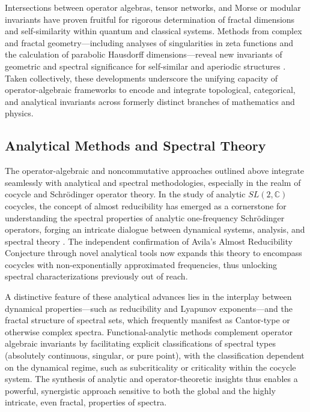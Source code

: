Intersections between operator algebras, tensor networks, and Morse or modular invariants have proven fruitful for rigorous determination of fractal dimensions and self-similarity within quantum and classical systems. Methods from complex and fractal geometry—including analyses of singularities in zeta functions and the calculation of parabolic Hausdorff dimensions—reveal new invariants of geometric and spectral significance for self-similar and aperiodic structures \cite{ref2,ref19,ref14}. Taken collectively, these developments underscore the unifying capacity of operator-algebraic frameworks to encode and integrate topological, categorical, and analytical invariants across formerly distinct branches of mathematics and physics.

\subsection{Analytical Methods and Spectral Theory}

The operator-algebraic and noncommutative approaches outlined above integrate seamlessly with analytical and spectral methodologies, especially in the realm of cocycle and Schrödinger operator theory. In the study of analytic $SL(2,\mathbb{C})$ cocycles, the concept of almost reducibility has emerged as a cornerstone for understanding the spectral properties of analytic one-frequency Schrödinger operators, forging an intricate dialogue between dynamical systems, analysis, and spectral theory \cite{ref91}. The independent confirmation of Avila's Almost Reducibility Conjecture through novel analytical tools now expands this theory to encompass cocycles with non-exponentially approximated frequencies, thus unlocking spectral characterizations previously out of reach.

A distinctive feature of these analytical advances lies in the interplay between dynamical properties—such as reducibility and Lyapunov exponents—and the fractal structure of spectral sets, which frequently manifest as Cantor-type or otherwise complex spectra. Functional-analytic methods complement operator algebraic invariants by facilitating explicit classifications of spectral types (absolutely continuous, singular, or pure point), with the classification dependent on the dynamical regime, such as subcriticality or criticality within the cocycle system. The synthesis of analytic and operator-theoretic insights thus enables a powerful, synergistic approach sensitive to both the global and the highly intricate, even fractal, properties of spectra.

